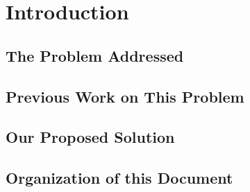 \documentclass[thesis.tex]{subfiles}
\begin{document}
\chapter{Introduction}

\section{The Problem Addressed}

\section{Previous Work on This Problem}

\section{Our Proposed Solution}

\section{Organization of this Document}
\end{document}

